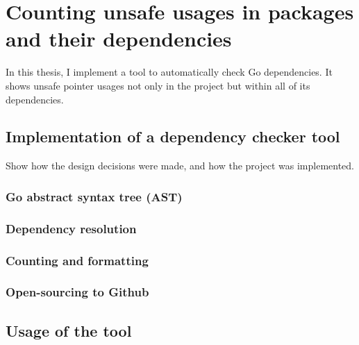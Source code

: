 
\chapter{Counting unsafe usages in packages and their dependencies}\label{ch:go-geiger}

In this thesis, I implement a tool to automatically check Go dependencies. It shows unsafe
pointer usages not only in the project but within all of its dependencies.



\section{Implementation of a dependency checker tool}\label{sec:go-geiger-implementation}

Show how the design decisions were made, and how the project was implemented.


\subsection{Go abstract syntax tree (AST)}\label{subsec:go-ast}


\subsection{Dependency resolution}\label{subsec:go-geiger-dependecy-resolution}


\subsection{Counting and formatting}\label{subsec:go-geiger-formatting}


\subsection{Open-sourcing to Github}\label{subsec:go-geiger-github}



\section{Usage of the tool}\label{sec:go-geiger-usage}

